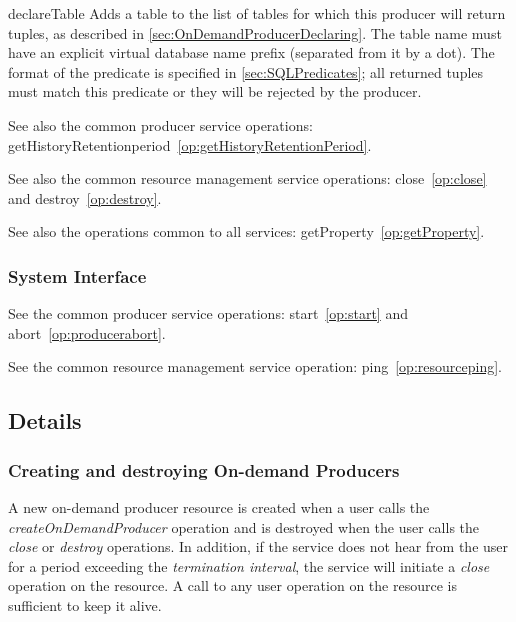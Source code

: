 \begin{method}{declareTable}
\OK
\desc
Adds a table to the list of tables for which this producer will return tuples,
as described in \ref{sec:OnDemandProducerDeclaring}.
The table name must have an explicit virtual database name prefix (separated
from it by a dot). The format of the predicate is specified
in \ref{sec:SQLPredicates}; all returned tuples must match this predicate or
they will be rejected by the producer. 
\end{method}

See also the common producer service operations:
getHistoryRetentionperiod~\ref{op:getHistoryRetentionPeriod}.

See also the common resource management service operations:
close~\ref{op:close} and
destroy~\ref{op:destroy}.

See also the operations common to all services:
getProperty~\ref{op:getProperty}.

\subsubsection{System Interface}

See  the common producer service operations:
start~\ref{op:start} and abort~\ref{op:producerabort}.

See the common resource management service operation:
ping~\ref{op:resourceping}.

\subsection{Details}
\subsubsection{Creating and destroying On-demand Producers}\label{sec:OnDemandProducerCreating}

A new on-demand producer resource is created when a user calls the
\textit{createOnDemandProducer} operation and is destroyed when the
user calls the \textit{close} or \textit{destroy} operations. In
addition, if the service does not hear from the user for a period
exceeding the \textit{termination interval}, the service will initiate
a \textit{close} operation on the resource. A call to any user
operation on the resource is sufficient to keep it alive.

